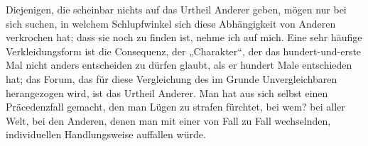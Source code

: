 Diejenigen, die scheinbar nichts auf das Urtheil Anderer geben, mögen nur bei sich suchen, in welchem Schlupfwinkel sich diese Abhängigkeit von Anderen verkrochen hat; dass sie noch zu finden ist, nehme ich auf mich. Eine sehr häufige Verkleidungsform ist die Consequenz, der „Charakter“, der das hundert-und-erste Mal nicht anders entscheiden zu dürfen glaubt, als er hundert Male entschieden hat; das Forum, das für diese Vergleichung des im Grunde Unvergleichbaren herangezogen wird, ist das Urtheil Anderer. Man hat aus sich selbst einen Präcedenzfall gemacht, den man Lügen zu strafen fürchtet, bei wem? bei aller Welt, bei den Anderen, denen man mit einer von Fall zu Fall wechselnden, individuellen Handlungsweise auffallen würde.
\par

